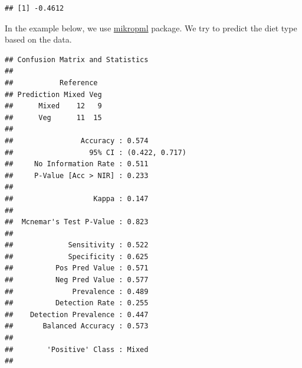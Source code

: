 \documentclass[
]{book}
\newenvironment{Shaded}{\begin{snugshade}}{\end{snugshade}}
\newcommand{\AttributeTok}[1]{\textcolor[rgb]{0.77,0.63,0.00}{#1}}
\newcommand{\CommentTok}[1]{\textcolor[rgb]{0.56,0.35,0.01}{\textit{#1}}}
\newcommand{\DecValTok}[1]{\textcolor[rgb]{0.00,0.00,0.81}{#1}}
\newcommand{\FloatTok}[1]{\textcolor[rgb]{0.00,0.00,0.81}{#1}}
\newcommand{\FunctionTok}[1]{\textcolor[rgb]{0.00,0.00,0.00}{#1}}
\newcommand{\NormalTok}[1]{#1}
\newcommand{\OtherTok}[1]{\textcolor[rgb]{0.56,0.35,0.01}{#1}}
\newcommand{\SpecialCharTok}[1]{\textcolor[rgb]{0.00,0.00,0.00}{#1}}
\newcommand{\StringTok}[1]{\textcolor[rgb]{0.31,0.60,0.02}{#1}}
\begin{document}
\begin{verbatim}
## [1] -0.4612
\end{verbatim}

In the example below, we use \href{https://journals.asm.org/doi/10.1128/mBio.00434-20}{mikropml}
package. We try to predict the diet type based on the data.

\begin{Shaded}
\end{Shaded}

\begin{verbatim}
## Confusion Matrix and Statistics
## 
##           Reference
## Prediction Mixed Veg
##      Mixed    12   9
##      Veg      11  15
##                                         
##                Accuracy : 0.574         
##                  95% CI : (0.422, 0.717)
##     No Information Rate : 0.511         
##     P-Value [Acc > NIR] : 0.233         
##                                         
##                   Kappa : 0.147         
##                                         
##  Mcnemar's Test P-Value : 0.823         
##                                         
##             Sensitivity : 0.522         
##             Specificity : 0.625         
##          Pos Pred Value : 0.571         
##          Neg Pred Value : 0.577         
##              Prevalence : 0.489         
##          Detection Rate : 0.255         
##    Detection Prevalence : 0.447         
##       Balanced Accuracy : 0.573         
##                                         
##        'Positive' Class : Mixed         
## 
\end{verbatim}
\end{document}
